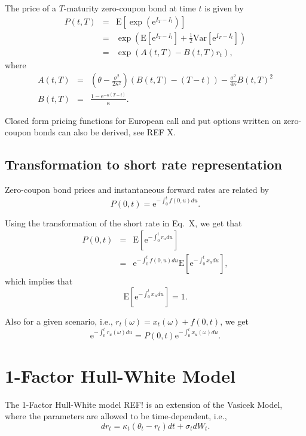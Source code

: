 \documentclass{report}
\newcommand{\E}{\mathrm{E}}
\newcommand{\Var}{\mathrm{Var}}
\newcommand{\e}{\text{e}}
\begin{document}
The price of a $T$-maturity zero-coupon bond at time $t$ is given by
\begin{eqnarray}
P(t,T) &=& \E \left[ \exp \left(\text{e}^{I_T - I_t} \right) \right] \\
&=& \exp \left( \E \left[ \text{e}^{I_T - I_t} \right] + \frac{1}{2} \Var \left[ \text{e}^{I_T - I_t} \right] \right) \\
&=& \exp \left( A(t,T) - B(t,T) r_t \right) ,
\end{eqnarray}
where
\begin{eqnarray}
A(t,T) &=& \left( \theta - \frac{\sigma^2}{2 \kappa^2} \right) \left( B(t,T) - (T- t)\right) - \frac{\sigma^2}{4 \kappa} B(t,T)^2 \\
B(t,T) &=& \frac{1 - \text{e}^{-\kappa (T-t)}}{\kappa}.
\end{eqnarray}

Closed form pricing functions for European call and put options written on zero-coupon bonds can also be derived, see REF X.

\subsection{Transformation to short rate representation}

Zero-coupon bond prices and instantaneous forward rates are related by
\begin{equation}
P(0,t) = \e^{- \int_0^t f(0,u) du}.
\end{equation}

Using the transformation of the short rate in Eq.~X, we get that
\begin{eqnarray}
P(0,t) &=& \E \left[ \e^{- \int_0^t r_u du} \right] \\
&=& \e^{- \int_0^t f(0,u) du} \E \left[ \e^{- \int_0^t x_u du} \right],
\end{eqnarray}
which implies that
\begin{equation}
\E \left[ \e^{- \int_0^t x_u du} \right] = 1.
\end{equation}

Also for a given scenario, i.e., $r_t(\omega) = x_t (\omega) + f(0,t)$, we get
\begin{equation}
\e^{- \int_0^t r_u (\omega) du} = P(0,t) \e^{- \int_0^t x_u (\omega) du}.
\end{equation}


\section{1-Factor Hull-White Model}
The 1-Factor Hull-White model REF! is an extension of the Vasicek Model, where the parameters are allowed to be time-dependent, i.e.,
\begin{equation}
dr_t = \kappa_t \left( \theta_t - r_t \right) dt + \sigma_t dW_t.
\end{equation}
\end{document}
